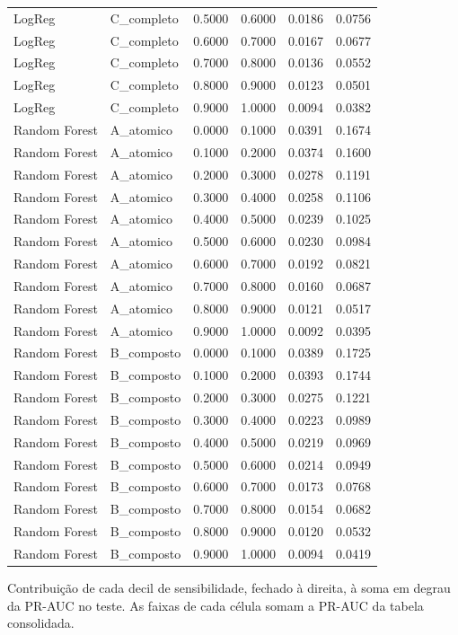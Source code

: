\begin{tabular}{llrrrr}
LogReg & C_completo & 0.5000 & 0.6000 & 0.0186 & 0.0756 \\
LogReg & C_completo & 0.6000 & 0.7000 & 0.0167 & 0.0677 \\
LogReg & C_completo & 0.7000 & 0.8000 & 0.0136 & 0.0552 \\
LogReg & C_completo & 0.8000 & 0.9000 & 0.0123 & 0.0501 \\
LogReg & C_completo & 0.9000 & 1.0000 & 0.0094 & 0.0382 \\
Random Forest & A_atomico & 0.0000 & 0.1000 & 0.0391 & 0.1674 \\
Random Forest & A_atomico & 0.1000 & 0.2000 & 0.0374 & 0.1600 \\
Random Forest & A_atomico & 0.2000 & 0.3000 & 0.0278 & 0.1191 \\
Random Forest & A_atomico & 0.3000 & 0.4000 & 0.0258 & 0.1106 \\
Random Forest & A_atomico & 0.4000 & 0.5000 & 0.0239 & 0.1025 \\
Random Forest & A_atomico & 0.5000 & 0.6000 & 0.0230 & 0.0984 \\
Random Forest & A_atomico & 0.6000 & 0.7000 & 0.0192 & 0.0821 \\
Random Forest & A_atomico & 0.7000 & 0.8000 & 0.0160 & 0.0687 \\
Random Forest & A_atomico & 0.8000 & 0.9000 & 0.0121 & 0.0517 \\
Random Forest & A_atomico & 0.9000 & 1.0000 & 0.0092 & 0.0395 \\
Random Forest & B_composto & 0.0000 & 0.1000 & 0.0389 & 0.1725 \\
Random Forest & B_composto & 0.1000 & 0.2000 & 0.0393 & 0.1744 \\
Random Forest & B_composto & 0.2000 & 0.3000 & 0.0275 & 0.1221 \\
Random Forest & B_composto & 0.3000 & 0.4000 & 0.0223 & 0.0989 \\
Random Forest & B_composto & 0.4000 & 0.5000 & 0.0219 & 0.0969 \\
Random Forest & B_composto & 0.5000 & 0.6000 & 0.0214 & 0.0949 \\
Random Forest & B_composto & 0.6000 & 0.7000 & 0.0173 & 0.0768 \\
Random Forest & B_composto & 0.7000 & 0.8000 & 0.0154 & 0.0682 \\
Random Forest & B_composto & 0.8000 & 0.9000 & 0.0120 & 0.0532 \\
Random Forest & B_composto & 0.9000 & 1.0000 & 0.0094 & 0.0419 \\
\bottomrule
\end{tabular}

\begin{flushleft}
\footnotesize Contribuição de cada decil de sensibilidade, fechado à direita, à soma em degrau da PR-AUC no teste. As faixas de cada célula somam a PR-AUC da tabela consolidada.
\end{flushleft}
